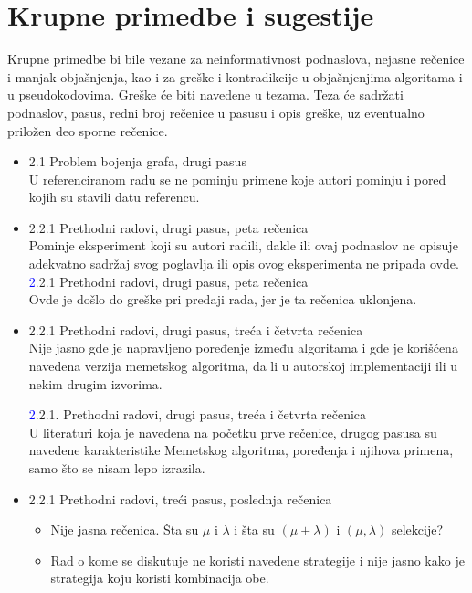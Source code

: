 \documentclass[a4paper]{report}
\newcommand{\odgovor}[1]{\textcolor{blue}{#1}}
\begin{document}
\section{Krupne primedbe i sugestije}
Krupne primedbe bi bile vezane za neinformativnost podnaslova, nejasne rečenice i manjak objašnjenja, kao i za greške i kontradikcije u objašnjenjima algoritama i u pseudokodovima. Greške će biti navedene u tezama. Teza će sadržati podnaslov, pasus, redni broj rečenice u pasusu i opis greške, uz eventualno priložen deo sporne rečenice.
\begin{itemize}
    \item 2.1 Problem bojenja grafa, drugi pasus \\
    U referenciranom radu se ne pominju primene koje autori pominju i pored kojih su stavili datu referencu.
    \item 2.2.1 Prethodni radovi, drugi pasus, peta rečenica \\
    Pominje eksperiment koji su autori radili, dakle ili ovaj podnaslov ne opisuje adekvatno sadržaj svog poglavlja ili opis ovog eksperimenta ne pripada ovde. \\
    \odgovor 2.2.1 Prethodni radovi, drugi pasus, peta rečenica \\
    Ovde je došlo do greške pri predaji rada, jer je ta rečenica uklonjena. \\
    
    \item 2.2.1 Prethodni radovi, drugi pasus, treća i četvrta rečenica \\
    Nije jasno gde je napravljeno poređenje između algoritama i gde je korišćena navedena verzija memetskog algoritma, da li u autorskoj implementaciji ili u nekim drugim izvorima.
    
    \odgovor 2.2.1. Prethodni radovi, drugi pasus, treća i četvrta rečenica \\
    U literaturi koja je navedena na početku prve rečenice, drugog pasusa su navedene karakteristike Memetskog algoritma, poređenja i njihova primena, samo što se nisam lepo izrazila.  
     


    
    \item 2.2.1 Prethodni radovi, treći pasus, poslednja rečenica
        \begin{itemize}
            \item Nije jasna rečenica. Šta su $\mu$ i $\lambda$ i šta su $(\mu + \lambda)$ i $(\mu, \lambda)$ selekcije?
            \item Rad o kome se diskutuje ne koristi navedene strategije i nije jasno kako je strategija koju koristi kombinacija obe.
        \end{itemize}
        

\end{itemize}
\end{document}
